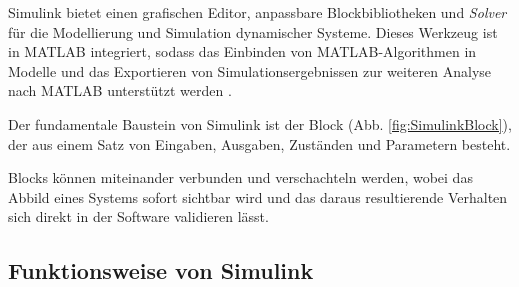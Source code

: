 Simulink bietet einen grafischen Editor, anpassbare Blockbibliotheken und \textit{Solver} für die Modellierung und Simulation dynamischer Systeme. Dieses Werkzeug ist in MATLAB integriert, sodass das Einbinden von MATLAB-Algorithmen in Modelle und das Exportieren von Simulationsergebnissen zur weiteren Analyse nach MATLAB unterstützt werden \cite{themathworksinc.SimulinkGettingStarted}.

Der fundamentale Baustein von Simulink ist der Block (Abb. \ref{fig:SimulinkBlock}), der aus einem Satz von Eingaben, Ausgaben, Zuständen und Parametern besteht. 


Blocks können miteinander verbunden und verschachteln werden, wobei das Abbild eines Systems sofort sichtbar wird und das daraus resultierende Verhalten sich direkt in der Software validieren lässt.

\subsection{Funktionsweise von Simulink}

